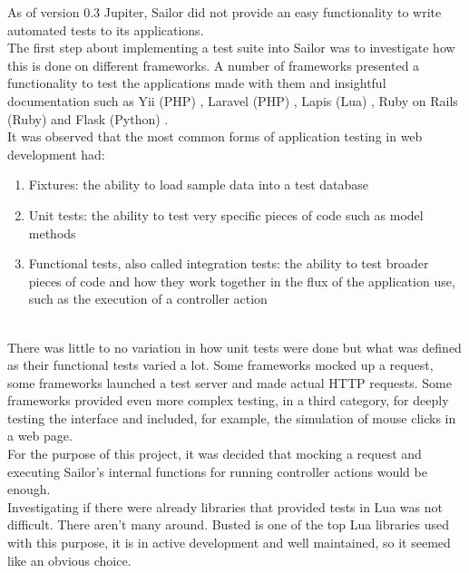 \documentclass{article}
\begin{document}
As of version 0.3 Jupiter, Sailor did not provide an easy functionality to write automated tests to its applications.\\

The first step about implementing a test suite into Sailor was to investigate how this is done on different frameworks. A number of frameworks presented a functionality to test the applications made with them and insightful documentation such as Yii (PHP)\autocite{yiiguide} , Laravel (PHP)\autocite{laravel} , Lapis (Lua)\autocite{lapis} , Ruby on Rails (Ruby)\autocite{rails}  and Flask (Python)\autocite{flask} .\\

It was observed that the most common forms of application testing in web development had:\\

\begin{enumerate}
\item Fixtures: the ability to load sample data into a test database
\item Unit tests: the ability to test very specific pieces of code such as model methods
\item Functional tests, also called integration tests: the ability to test broader pieces of code and how they work together in the flux of the application use, such as the execution of a controller action
\end{enumerate}\\

There was little to no variation in how unit tests were done but what was defined as their functional tests varied a lot. Some frameworks mocked up a request, some frameworks launched a test server and made actual HTTP requests. Some frameworks provided even more complex testing, in a third category, for deeply testing the interface and included, for example, the simulation of mouse clicks in a web page. \\

For the purpose of this project, it was decided that mocking a request and executing Sailor's internal functions for running controller actions would be enough.\\

Investigating if there were already libraries that provided tests in Lua was not difficult. There aren't many around. Busted\autocite{busted}  is one of the top Lua libraries used with this purpose, it is in active development and well maintained, so it seemed like an obvious choice. \\
\end{document}
